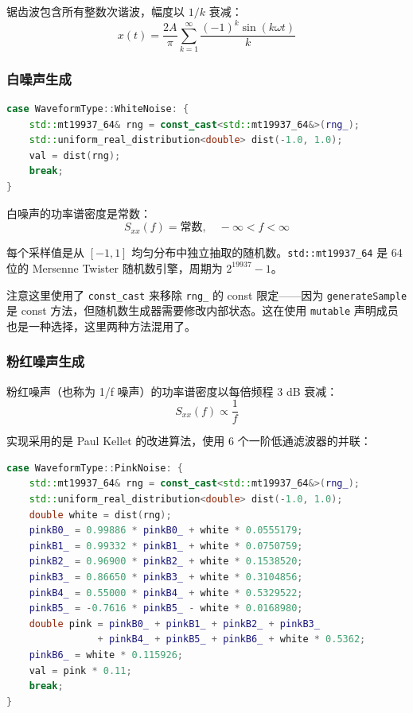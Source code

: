 ﻿\documentclass[12pt,a4paper,oneside]{ctexbook}
\begin{document}
锯齿波包含所有整数次谐波，幅度以 \(1/k\) 衰减：
\[
x(t) = \frac{2A}{\pi} \sum_{k=1}^{\infty} \frac{(-1)^k \sin(k\omega t)}{k}
\]

\subsubsection{白噪声生成}

\begin{lstlisting}[language=C++, caption={generateSample——白噪声分支}]
case WaveformType::WhiteNoise: {
    std::mt19937_64& rng = const_cast<std::mt19937_64&>(rng_);
    std::uniform_real_distribution<double> dist(-1.0, 1.0);
    val = dist(rng);
    break;
}
\end{lstlisting}

白噪声的功率谱密度是常数：
\[
S_{xx}(f) = \text{常数}, \quad -\infty < f < \infty
\]

每个采样值是从 \([-1, 1]\) 均匀分布中独立抽取的随机数。\texttt{std::mt19937\_64} 是 64 位的 Mersenne Twister 随机数引擎，周期为 \(2^{19937}-1\)。

注意这里使用了 \texttt{const\_cast} 来移除 \texttt{rng\_} 的 const 限定——因为 \texttt{generateSample} 是 const 方法，但随机数生成器需要修改内部状态。这在使用 \texttt{mutable} 声明成员也是一种选择，这里两种方法混用了。

\subsubsection{粉红噪声生成}

粉红噪声（也称为 1/f 噪声）的功率谱密度以每倍频程 3 dB 衰减：
\[
S_{xx}(f) \propto \frac{1}{f}
\]

实现采用的是 Paul Kellet 的改进算法，使用 6 个一阶低通滤波器的并联：
\begin{lstlisting}[language=C++, caption={generateSample——粉红噪声分支}]
case WaveformType::PinkNoise: {
    std::mt19937_64& rng = const_cast<std::mt19937_64&>(rng_);
    std::uniform_real_distribution<double> dist(-1.0, 1.0);
    double white = dist(rng);
    pinkB0_ = 0.99886 * pinkB0_ + white * 0.0555179;
    pinkB1_ = 0.99332 * pinkB1_ + white * 0.0750759;
    pinkB2_ = 0.96900 * pinkB2_ + white * 0.1538520;
    pinkB3_ = 0.86650 * pinkB3_ + white * 0.3104856;
    pinkB4_ = 0.55000 * pinkB4_ + white * 0.5329522;
    pinkB5_ = -0.7616 * pinkB5_ - white * 0.0168980;
    double pink = pinkB0_ + pinkB1_ + pinkB2_ + pinkB3_
                + pinkB4_ + pinkB5_ + pinkB6_ + white * 0.5362;
    pinkB6_ = white * 0.115926;
    val = pink * 0.11;
    break;
}
\end{lstlisting}
\end{document}
